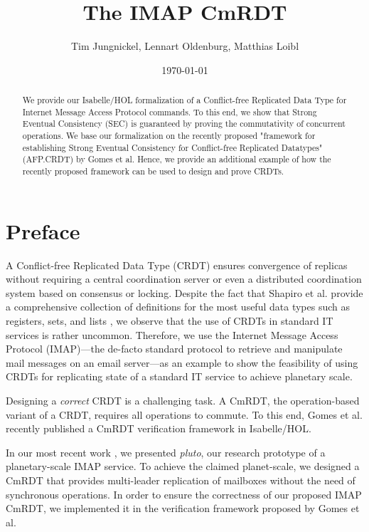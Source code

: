 \documentclass[11pt,a4paper,DIV=11]{article}
\title{The IMAP CmRDT}
\author{Tim Jungnickel, Lennart Oldenburg, Matthias Loibl}
\date{\today}
\begin{document}
\maketitle


\begin{abstract}
We provide our Isabelle/HOL formalization of a Conflict-free Replicated Data Type
for Internet Message Access Protocol commands. To this end, we show that Strong
Eventual Consistency (SEC) is guaranteed by proving the commutativity of concurrent
operations. We base our formalization on the recently proposed "framework for
establishing Strong Eventual Consistency for Conflict-free Replicated Datatypes"
(AFP.CRDT) by Gomes et al{.} Hence, we provide an additional example of how the
recently proposed framework can be used to design and prove CRDTs.
\end{abstract}


\tableofcontents


\section{Preface}

A Conflict-free Replicated Data Type (CRDT) \cite{shapiro_crdt} ensures
convergence of replicas without requiring a central coordination server or
even a distributed coordination system based on consensus or locking.
Despite the fact that Shapiro et al{.} provide a comprehensive collection
of definitions for the most useful data types such as registers, sets, and
lists \cite{shapiro_report}, we observe that the use of CRDTs in standard IT
services is rather uncommon. Therefore, we use the Internet Message Access
Protocol (IMAP)---the de-facto standard protocol to retrieve and manipulate mail
messages on an email server---as an example to show the feasibility of using
CRDTs for replicating state of a standard IT service to achieve planetary scale.

Designing a \emph{correct} CRDT is a challenging task. A CmRDT, the
operation-based variant of a CRDT, requires all operations to commute.
To this end, Gomes et al{.} recently published a CmRDT verification
framework \cite{gomes_crdtafp} in Isabelle/HOL.

In our most recent work \cite{pluto}, we presented \emph{pluto}, our research
prototype of a planetary-scale IMAP service. To achieve the claimed
planet-scale, we designed a CmRDT that provides multi-leader replication
of mailboxes without the need of synchronous operations. In order to ensure
the correctness of our proposed IMAP CmRDT, we implemented it in the
verification framework proposed by Gomes et al{.}
\end{document}
